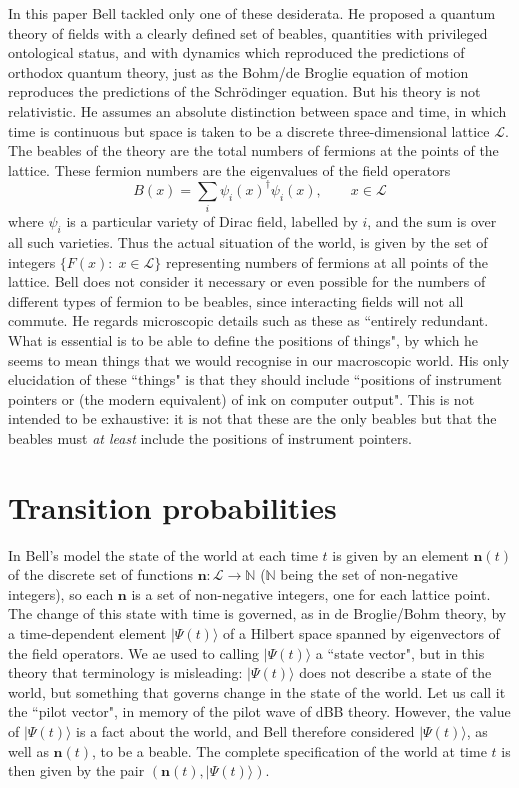 \documentclass[12pt,reqno]{article}
\renewcommand{\(}{\left(}
\renewcommand{\)}{\right)}
\renewcommand{\.}{\centerdot}
\newcommand{\n}{\mathbf{n}}
\newcommand{\N}{\mathbb{N}}
\renewcommand{\L}{\mathcal{L}}
\newcommand{\1}{\mathbf{1}}
\newcommand{\<}{\langle}
\renewcommand{\>}{\rangle}
\theoremstyle{definition}
\theoremstyle{remark}
\numberwithin{equation}{section}
\begin{document}
In this paper Bell tackled only one of these desiderata. He proposed a quantum theory of fields with a clearly defined set of beables, quantities with privileged ontological status, and with dynamics which reproduced the predictions of orthodox quantum theory, just as the Bohm/de Broglie equation of motion reproduces the predictions of the Schr\"odinger equation. But his theory is not relativistic. He assumes an absolute distinction between space and time, in which time is continuous but space is taken to be a discrete three-dimensional lattice $\mathcal{L}$. The beables of the theory are the total numbers of fermions at the points of the lattice. These fermion numbers are the eigenvalues of the field operators 
\[
B(x) = \sum_i \psi_i(x)^\dagger\psi_i(x), \qquad x\in\L
\]
where $\psi_i$ is a particular variety of Dirac field, labelled by $i$, and the sum is over all such varieties. Thus the actual situation of the world, is given by the set of integers $\{F(x):\; x\in\L\}$ representing numbers of fermions at all points of the lattice. Bell does not consider it necessary or even possible for the numbers of different types of fermion to be beables, since interacting fields will not all commute. He regards microscopic details such as these as ``entirely redundant. What is essential is to be able to define the positions of things", by which he seems to mean things that we would recognise in our macroscopic world. His only elucidation of these ``things" is that they should include ``positions of instrument pointers or (the modern equivalent) of ink on computer output". This is not intended to be exhaustive: it is not that these are the only beables but that the beables must \emph{at least} include the positions of instrument pointers.
 

\section{Transition probabilities}

In Bell's model the state of the world at each time $t$ is given by an element $\n(t)$ of the discrete set of functions $\n:\L\to\N$ ($\N$ being the set of non-negative integers), so each $\n$ is a set of non-negative integers, one for each lattice point. The change of this state with time is governed, as in de Broglie/Bohm theory, by a time-dependent element $|\Psi(t)\>$ of a Hilbert space spanned by eigenvectors of the field operators. We ae used to calling $|\Psi(t)\>$ a ``state vector", but in this theory that terminology is misleading: $|\Psi(t)\>$ does not describe a state of the world, but something that governs change in the state of the world. Let us call it the ``pilot vector", in memory of the pilot wave of dBB theory. However, the value of $|\Psi(t)\>$ is a fact about the world, and Bell therefore considered $|\Psi(t)\>$, as well as $\n(t)$, to be a beable. The complete specification of the world at time $t$ is then given by the pair $(\n(t),|\Psi(t)\>)$.
 
\end{document}
